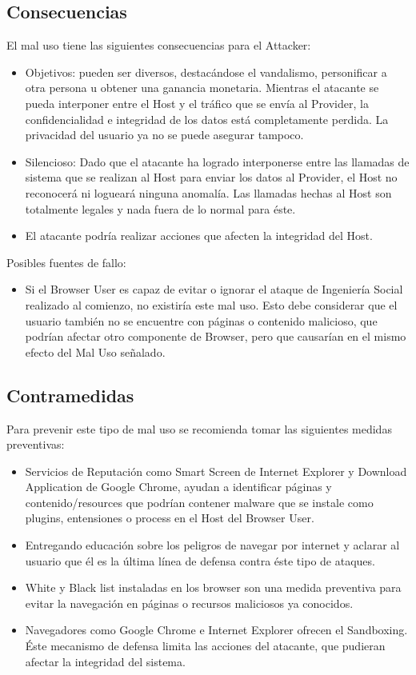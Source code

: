 \subsection{Consecuencias}
	El mal uso tiene las siguientes consecuencias para el Attacker:
	\begin{itemize}
		\item Objetivos: pueden ser diversos, destacándose el vandalismo, personificar a otra persona u obtener una ganancia monetaria. Mientras el atacante se pueda interponer entre el Host y el tráfico que se envía al Provider, la confidencialidad e integridad de los datos está completamente perdida. La privacidad del usuario ya no se puede asegurar tampoco.
		\item Silencioso: Dado que el atacante ha logrado interponerse entre las llamadas de sistema que se realizan al Host para enviar los datos al Provider, el Host no reconocerá ni logueará ninguna anomalía. Las llamadas hechas al Host son totalmente legales y nada fuera de lo normal para éste.
		\item El atacante podría realizar acciones que afecten la integridad del Host.
	\end{itemize}
	Posibles fuentes de fallo:
	\begin{itemize}
		\item Si el Browser User es capaz de evitar o ignorar el ataque de Ingeniería Social realizado al comienzo, no existiría este mal uso. Esto debe considerar que el usuario también no se encuentre con páginas o contenido malicioso, que podrían afectar otro componente de Browser, pero que causarían en el mismo efecto del Mal Uso señalado.
	\end{itemize}

\subsection{Contramedidas} 
	Para prevenir este tipo de mal uso se recomienda tomar las siguientes medidas preventivas:
	\begin{itemize}
		\item Servicios de Reputación como Smart Screen de Internet Explorer y Download Application de Google Chrome, ayudan a identificar páginas y contenido/resources que podrían contener malware que se instale como plugins, entensiones o process en el Host del Browser User.
		\item Entregando educación sobre los peligros de navegar por internet y aclarar al usuario que él es la última línea de defensa contra éste tipo de ataques.
		\item White y Black list instaladas en los browser son una medida preventiva para evitar la navegación en páginas o recursos maliciosos ya conocidos.
		\item Navegadores como Google Chrome e Internet Explorer ofrecen el Sandboxing. Éste mecanismo de defensa limita las acciones del atacante, que pudieran afectar la integridad del sistema.
	\end{itemize}

